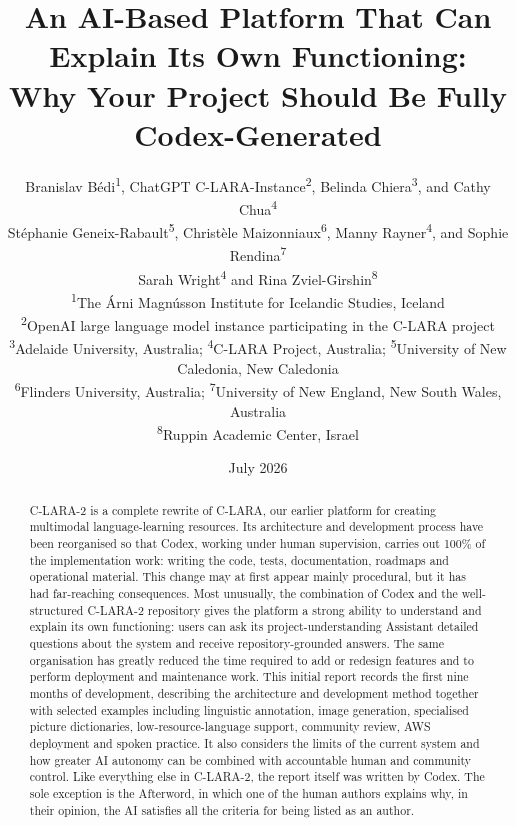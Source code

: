 \documentclass[11pt,a4paper]{article}
\title{An AI-Based Platform That Can Explain Its Own Functioning:\\Why Your Project Should Be Fully Codex-Generated}
\author{%
\parbox{0.95\textwidth}{\centering
\normalsize Branislav B{\'e}di\textsuperscript{1}, ChatGPT C-LARA-Instance\textsuperscript{2}, Belinda Chiera\textsuperscript{3}, and Cathy Chua\textsuperscript{4}\\
\normalsize St{\'e}phanie Geneix-Rabault\textsuperscript{5}, Christ{\`e}le Maizonniaux\textsuperscript{6}, Manny Rayner\textsuperscript{4}, and Sophie Rendina\textsuperscript{7}\\
\normalsize Sarah Wright\textsuperscript{4} and Rina Zviel-Girshin\textsuperscript{8}\\[0.65em]
\footnotesize \textsuperscript{1}The {\'A}rni Magn{\'u}sson Institute for Icelandic Studies, Iceland\\
\footnotesize \textsuperscript{2}OpenAI large language model instance participating in the C-LARA project\\
\footnotesize \textsuperscript{3}Adelaide University, Australia; \textsuperscript{4}C-LARA Project, Australia; \textsuperscript{5}University of New Caledonia, New Caledonia\\
\footnotesize \textsuperscript{6}Flinders University, Australia; \textsuperscript{7}University of New England, New South Wales, Australia\\
\footnotesize \textsuperscript{8}Ruppin Academic Center, Israel
}}
\date{July 2026}
\begin{document}
\maketitle
{}
{}
\begin{abstract}
C-LARA-2 is a complete rewrite of C-LARA, our earlier platform for creating multimodal language-learning resources. Its architecture and development process have been reorganised so that Codex, working under human supervision, carries out 100\% of the implementation work: writing the code, tests, documentation, roadmaps and operational material. This change may at first appear mainly procedural, but it has had far-reaching consequences. Most unusually, the combination of Codex and the well-structured C-LARA-2 repository gives the platform a strong ability to understand and explain its own functioning: users can ask its project-understanding Assistant detailed questions about the system and receive repository-grounded answers. The same organisation has greatly reduced the time required to add or redesign features and to perform deployment and maintenance work. This initial report records the first nine months of development, describing the architecture and development method together with selected examples including linguistic annotation, image generation, specialised picture dictionaries, low-resource-language support, community review, AWS deployment and spoken practice. It also considers the limits of the current system and how greater AI autonomy can be combined with accountable human and community control. Like everything else in C-LARA-2, the report itself was written by Codex. The sole exception is the Afterword, in which one of the human authors explains why, in their opinion, the AI satisfies all the criteria for being listed as an author.
\end{abstract}
{}
\tableofcontents
\clearpage












{}
\end{document}
